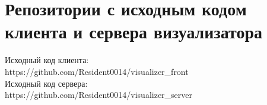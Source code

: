 \chapter{Репозитории с исходным кодом клиента и сервера визуализатора}\label{appendix-MikTeX-TexStudio} %

Исходный код клиента:\\
https://github.com/Resident0014/visualizer\_front\\

Исходный код сервера:\\
https://github.com/Resident0014/visualizer\_server\\
